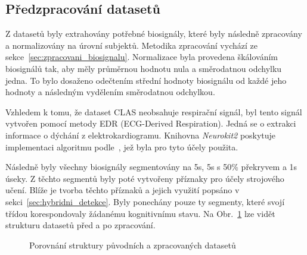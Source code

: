 \subsection{Předzpracování datasetů}
\label{subsec:predzpracovani_datasetu}
Z datasetů byly extrahovány potřebné biosignály, které byly následně zpracovány
a normalizovány na úrovní subjektů. Metodika zpracování vychází ze
sekce~\ref{sec:zpracovani_biosignalu}. Normalizace byla provedena škálováním
biosignálů tak, aby měly průměrnou hodnotu nula a směrodatnou odchylku jedna. To
bylo dosaženo odečtením střední hodnoty biosignálu od každé jeho hodnoty a
následným vydělením směrodatnou odchylkou.

Vzhledem k tomu, že dataset CLAS neobsahuje respirační signál, byl tento signál
vytvořen pomocí metody \gls{EDR} (ECG-Derived Respiration). Jedná se o extrakci
informace o dýchání z elektrokardiogramu. Knihovna \textit{Neurokit2} poskytuje
implementaci algoritmu podle~\cite{VanGent2019}, jež byla pro tyto účely
použita.

Následně byly všechny biosignály segmentovány na 5s, 5s s 50\% překryvem a 1s
úseky. Z těchto segmentů byly poté vytvořeny příznaky pro účely strojového
učení. Blíže je tvorba těchto příznaků a jejich využití popsáno v
sekci~\ref{sec:hybridni_detekce}. Byly ponechány pouze ty segmenty, které svojí
třídou korespondovaly žádanému kognitivnímu stavu. Na
Obr.~\ref{fig:struktura_datasetu} lze vidět strukturu datasetů před a po
zpracování.

\begin{figure}[h]
    \centering
    \caption{Porovnání struktury původních a zpracovaných datasetů}
    \label{fig:struktura_datasetu}
\end{figure}

